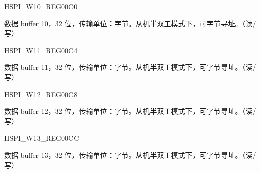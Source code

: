 \begin{register}{H}{SPI\_W10\_REG}{\hexprefix{}00C0}\label{regdesc:SPIW10REG}
%
\regnewline%
\begin{regdesc}\begin{reglist}
\label{fielddesc:SPIBUF10}\item [SPI\_BUF10] 数据 buffer 10，32 位，传输单位：字节。从机半双工模式下，可字节寻址。（读/写）
\end{reglist}\end{regdesc}
\end{register}


\begin{register}{H}{SPI\_W11\_REG}{\hexprefix{}00C4}\label{regdesc:SPIW11REG}
%
\regnewline%
\begin{regdesc}\begin{reglist}
\label{fielddesc:SPIBUF11}\item [SPI\_BUF11] 数据 buffer 11，32 位，传输单位：字节。从机半双工模式下，可字节寻址。（读/写）
\end{reglist}\end{regdesc}
\end{register}


\begin{register}{H}{SPI\_W12\_REG}{\hexprefix{}00C8}\label{regdesc:SPIW12REG}
%
\regnewline%
\begin{regdesc}\begin{reglist}
\label{fielddesc:SPIBUF12}\item [SPI\_BUF12] 数据 buffer 12，32 位，传输单位：字节。从机半双工模式下，可字节寻址。（读/写）
\end{reglist}\end{regdesc}
\end{register}


\begin{register}{H}{SPI\_W13\_REG}{\hexprefix{}00CC}\label{regdesc:SPIW13REG}
%
\regnewline%
\begin{regdesc}\begin{reglist}
\label{fielddesc:SPIBUF13}\item [SPI\_BUF13] 数据 buffer 13，32 位，传输单位：字节。从机半双工模式下，可字节寻址。（读/写）
\end{reglist}\end{regdesc}
\end{register}


